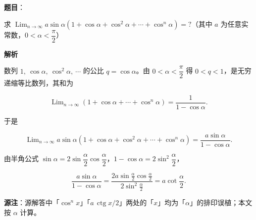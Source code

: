 \begin{answer}

\textbf{题目}：

求 $\operatorname{Lim}_{n\to\infty}a\sin\alpha\left(1+\cos\alpha+\cos^{2}\alpha+\cdots+\cos^{n}\alpha\right)=?$（其中 $a$ 为任意实常数，$0<\alpha<\dfrac{\pi}{2}$）

\textbf{解析}

数列 $1,\ \cos\alpha,\ \cos^{2}\alpha,\ \cdots$ 的公比 $q=\cos\alpha$。由 $0<\alpha<\dfrac{\pi}{2}$ 得 $0<q<1$，是无穷递缩等比数列，其和为

\nopagebreak[4]
\[
\operatorname{Lim}_{n\to\infty}\left(1+\cos\alpha+\cdots+\cos^{n}\alpha\right)=\frac{1}{1-\cos\alpha}.
\]

于是

\nopagebreak[4]
\[
\operatorname{Lim}_{n\to\infty}a\sin\alpha\left(1+\cos\alpha+\cos^{2}\alpha+\cdots+\cos^{n}\alpha\right)
=\frac{a\sin\alpha}{1-\cos\alpha}.
\]

由半角公式 $\sin\alpha=2\sin\dfrac{\alpha}{2}\cos\dfrac{\alpha}{2}$，$1-\cos\alpha=2\sin^{2}\dfrac{\alpha}{2}$，

\nopagebreak[4]
\[
\frac{a\sin\alpha}{1-\cos\alpha}
=\frac{2a\sin\frac{\alpha}{2}\cos\frac{\alpha}{2}}{2\sin^{2}\frac{\alpha}{2}}
=a\cot\frac{\alpha}{2}.
\]

\begin{gktip}
\textbf{源注}：源解答中「$\cos^n x$」「$a\,\operatorname{ctg} x/2$」两处的「$x$」均为「$\alpha$」的排印误植；本文按 $\alpha$ 计算。
\end{gktip}


\end{answer}
